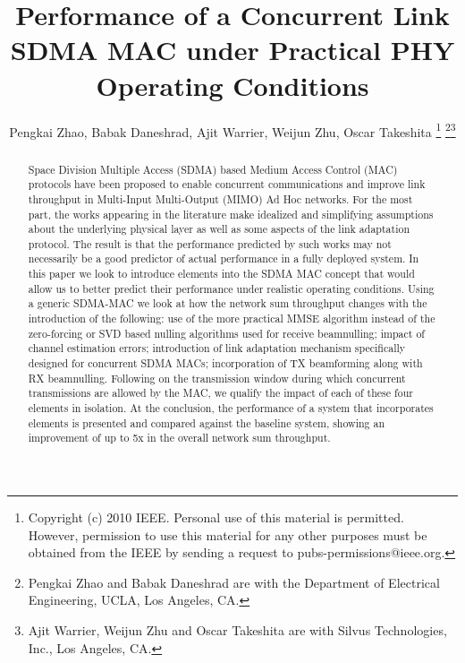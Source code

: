 \documentclass[journal, final]{IEEEtran}
\begin{document}
\title{Performance of a Concurrent Link SDMA MAC under Practical PHY
Operating Conditions}


\author{Pengkai Zhao, Babak Daneshrad, Ajit Warrier, Weijun Zhu,
        Oscar Takeshita \thanks{Copyright (c) 2010 IEEE. Personal use of this material is permitted.
        However, permission to use this material for any other purposes must be obtained from the
        IEEE by sending a request to pubs-permissions@ieee.org.}
  \thanks{Pengkai Zhao and Babak Daneshrad are with the Department
 of Electrical Engineering, UCLA, Los Angeles, CA.}\thanks{Ajit Warrier, Weijun Zhu and Oscar Takeshita are with Silvus Technologies, Inc., Los Angeles, CA.}}



















\maketitle


\begin{abstract}
Space Division Multiple Access (SDMA) based Medium Access Control (MAC)
protocols have been proposed to enable concurrent communications and improve
link throughput in Multi-Input Multi-Output (MIMO) Ad Hoc networks. For the
most part, the works appearing in the literature make idealized and
simplifying assumptions about the underlying physical layer as well as some
aspects of the link adaptation protocol. The result is that the performance
predicted by such works may not necessarily be a good predictor of actual
performance in a fully deployed system. In this paper we look to introduce
elements into the SDMA MAC concept that would allow us to better predict
their performance under realistic operating conditions. Using a generic
SDMA-MAC we look at how the network sum throughput changes with the
introduction of the following:  use of the more practical MMSE algorithm
instead of the zero-forcing or SVD based nulling algorithms used for receive
beamnulling;  impact of channel estimation errors;  introduction of link
adaptation mechanism specifically designed for concurrent SDMA MACs; 
incorporation of TX beamforming along with RX beamnulling. Following on the
transmission window during which concurrent transmissions are allowed by the
MAC, we qualify the impact of each of these four elements in isolation. At
the conclusion, the performance of a system that incorporates elements  is
presented and compared against the baseline system, showing an improvement
of up to 5x in the overall network sum throughput.
\end{abstract}
\end{document}
